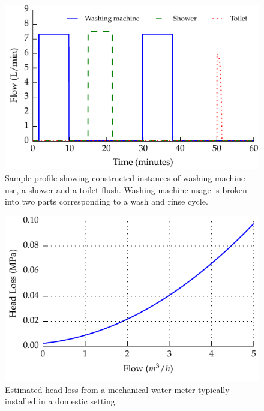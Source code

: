 \documentclass[10pt,final,journal]{IEEEtran}
\begin{document}
        \begin{figure}
            \begin{center}
            \includegraphics[width=\linewidth]{graph_profile}
            \end{center}
            \caption{Sample profile showing constructed instances of washing machine use, a shower and a toilet flush.
            Washing machine usage is broken into two parts corresponding to a wash and rinse cycle.}
            \label{fig:profileSample}
        \end{figure}

        \begin{figure}
            \begin{center}
            \includegraphics[width=\linewidth]{graph_pressureLoss}
            \end{center}
            \caption{Estimated head loss from a mechanical water meter typically installed in a domestic setting.}
            \label{fig:headloss}
        \end{figure}
\end{document}
